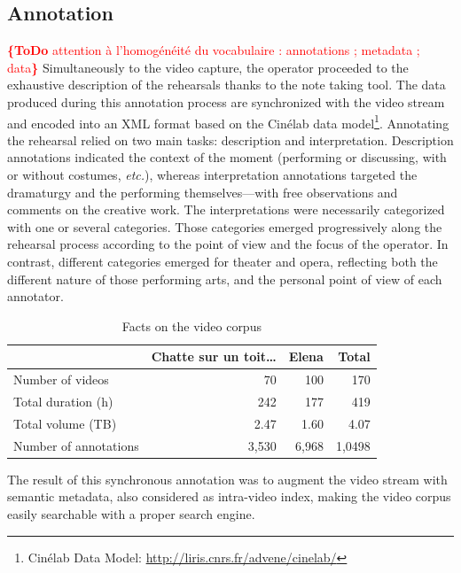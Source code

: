 \documentclass[conference]{IEEEtran}
\newcommand{\todo}[1]{\noindent\textcolor{red}{{\bf \{ToDo} #1{\bf \}}}}
\begin{document}
\subsection{Annotation}
\todo{attention à l'homogénéité du vocabulaire : annotations ; metadata ; data}
Simultaneously to the video capture, the operator proceeded to the exhaustive description of the rehearsals thanks to the note taking tool. The data produced during this annotation process are synchronized with the video stream and encoded into an XML format based on the Cinélab data model\footnote{Cinélab Data Model: \url{http://liris.cnrs.fr/advene/cinelab/}}.
Annotating the rehearsal relied on two main tasks: description and interpretation.  Description annotations indicated the context of the moment (performing or discussing, with or without costumes, \emph{etc.}), whereas interpretation annotations targeted the dramaturgy and the performing themselves---with free observations and comments on the creative work. The interpretations were necessarily categorized with one or several categories. Those categories emerged progressively along the rehearsal process according to the point of view and the focus of the operator. 
In contrast, different categories emerged for theater and opera, reflecting both the different nature of those performing arts, and the personal point of view of each annotator.

\begin{table}
\centering
{\small
\begin{tabular}{|l|r|r|r|}
\hline 
  & Chatte sur un toit\ldots & Elena & Total \\ 
\hline 
Number of videos & 70 & 100 & 170 \\ 
\hline 
Total duration (h) & 242 & 177 & 419 \\ 
\hline 
Total volume (TB) & 2.47 & 1.60 & 4.07 \\ 
\hline 
Number of annotations & 3,530 & 6,968 & 1,0498\\ 
\hline
\end{tabular} 
}
\caption{Facts on the video corpus}
\label{table_facts}
\end{table}

The result of this synchronous annotation was to augment the video stream with semantic metadata, also considered as intra-video index, making the video corpus easily searchable with a proper search engine.
\end{document}
